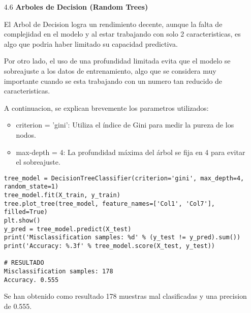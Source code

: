 \documentclass{article}
\begin{document}
\bigskip

\begin{itemize}

\item[4.6]  {\bf Arboles de Decision (Random Trees)}

El Arbol de Decision logra un rendimiento decente, aunque la falta de complejidad en el modelo y al estar trabajando con solo 2 caracteristicas, es algo que podria haber limitado su capacidad predictiva.

Por otro lado, el uso de una profundidad limitada evita que el modelo se sobreajuste a los datos de entrenamiento, algo que se considera muy importante cuando se esta trabajando con un numero tan reducido de caracteristicas.

A continuacion, se explican brevemente los parametros utilizados:

\begin{itemize}

\item
criterion = 'gini': Utiliza el índice de Gini para medir la pureza de los nodos.

\item
max-depth = 4: La profundidad máxima del árbol se fija en 4 para evitar el sobreajuste.

\end{itemize}

\begin{tcolorbox}[width=14cm]
\begin{scriptsize}
\begin{verbatim}
tree_model = DecisionTreeClassifier(criterion='gini', max_depth=4, random_state=1)
tree_model.fit(X_train, y_train)
tree.plot_tree(tree_model, feature_names=['Col1', 'Col7'], filled=True)
plt.show()
y_pred = tree_model.predict(X_test)
print('Misclassification samples: %d' % (y_test != y_pred).sum())
print('Accuracy: %.3f' % tree_model.score(X_test, y_test))

# RESULTADO
Misclassification samples: 178
Accuracy. 0.555
\end{verbatim}
\end{scriptsize}
\end{tcolorbox}

Se han obtenido como resultado 178 muestras mal clasificadas y una precision de 0.555.

\end{itemize}

\end{document}
